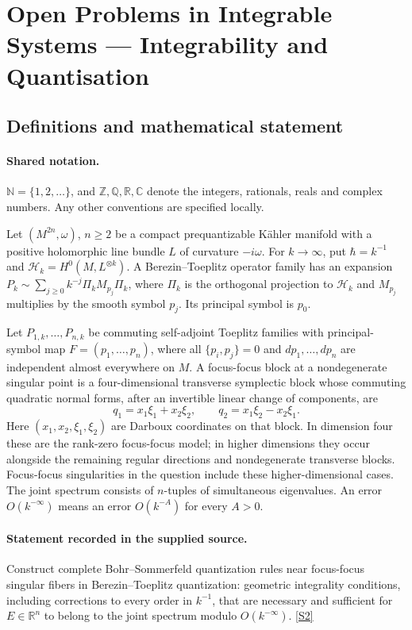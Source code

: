 \documentclass[11pt]{article}
\newcommand{\sref}[2]{\hyperlink{source:#1:#2}{[S#2]}}
\begin{document}
\section{Open Problems in Integrable Systems — Integrability and Quantisation}\label{statement}

\subsection{Definitions and mathematical statement}

\paragraph{Shared notation.}$\mathbb N=\{1,2,\ldots\}$, and $\mathbb Z,\mathbb Q,\mathbb R,\mathbb C$ denote the integers, rationals, reals and complex numbers. Any other conventions are specified locally.


Let $(M^{2n},\omega)$, $n\geq2$ be a compact prequantizable Kähler manifold with a positive holomorphic line bundle $L$ of curvature $-i\omega$. For $k\to\infty$, put $\hbar=k^{-1}$ and $\mathcal H_k=H^0(M,L^{\otimes k})$. A Berezin--Toeplitz operator family has an expansion $P_k\sim\sum_{j\geq0}k^{-j}\Pi_k M_{p_j}\Pi_k$, where $\Pi_k$ is the orthogonal projection to $\mathcal H_k$ and $M_{p_j}$ multiplies by the smooth symbol $p_j$. Its principal symbol is $p_0$.\par Let $P_{1,k},\ldots,P_{n,k}$ be commuting self-adjoint Toeplitz families with principal-symbol map $F=(p_1,\ldots,p_n)$, where all $\{p_i,p_j\}=0$ and $dp_1,\ldots,dp_n$ are independent almost everywhere on $M$. A focus-focus block at a nondegenerate singular point is a four-dimensional transverse symplectic block whose commuting quadratic normal forms, after an invertible linear change of components, are
\[q_1=x_1\xi_1+x_2\xi_2,\qquad q_2=x_1\xi_2-x_2\xi_1.\]
Here $(x_1,x_2,\xi_1,\xi_2)$ are Darboux coordinates on that block. In dimension four these are the rank-zero focus-focus model; in higher dimensions they occur alongside the remaining regular directions and nondegenerate transverse blocks. Focus-focus singularities in the question include these higher-dimensional cases. The joint spectrum consists of $n$-tuples of simultaneous eigenvalues. An error $O(k^{-\infty})$ means an error $O(k^{-A})$ for every $A>0$.
\paragraph{Statement recorded in the supplied source.}
Construct complete Bohr--Sommerfeld quantization rules near focus-focus singular fibers in Berezin--Toeplitz quantization: geometric integrality conditions, including corrections to every order in $k^{-1}$, that are necessary and sufficient for $E\in\mathbb R^n$ to belong to the joint spectrum modulo $O(k^{-\infty})$. \sref{statement}{2}
\end{document}

